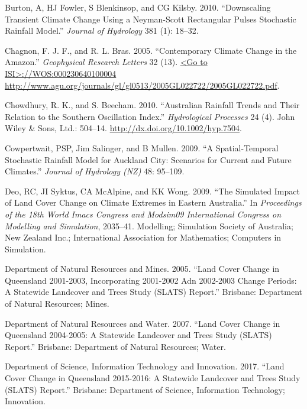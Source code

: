 \documentclass[]{elsarticle} %
\theoremstyle{definition}
\theoremstyle{definition}
\theoremstyle{definition}
\theoremstyle{remark}
\begin{document}
\hypertarget{ref-Burton2010}{}
Burton, A, HJ Fowler, S Blenkinsop, and CG Kilsby. 2010. ``Downscaling
Transient Climate Change Using a Neyman-Scott Rectangular Pulses
Stochastic Rainfall Model.'' \emph{Journal of Hydrology} 381 (1):
18--32.

\hypertarget{ref-Chagnon2005}{}
Chagnon, F. J. F., and R. L. Bras. 2005. ``Contemporary Climate Change
in the Amazon.'' \emph{Geophysical Research Letters} 32 (13).
\href{\%3CGo\%20to\%20ISI\%3E://WOS:000230640100004\%20http://www.agu.org/journals/gl/gl0513/2005GL022722/2005GL022722.pdf}{\textless{}Go to ISI\textgreater{}://WOS:000230640100004 http://www.agu.org/journals/gl/gl0513/2005GL022722/2005GL022722.pdf}.

\hypertarget{ref-Chowdhury2010}{}
Chowdhury, R. K., and S. Beecham. 2010. ``Australian Rainfall Trends and
Their Relation to the Southern Oscillation Index.'' \emph{Hydrological
Processes} 24 (4). John Wiley \& Sons, Ltd.: 504--14.
\url{http://dx.doi.org/10.1002/hyp.7504}.

\hypertarget{ref-Cowpertwait2009}{}
Cowpertwait, PSP, Jim Salinger, and B Mullen. 2009. ``A Spatial-Temporal
Stochastic Rainfall Model for Auckland City: Scenarios for Current and
Future Climates.'' \emph{Journal of Hydrology (NZ)} 48: 95--109.

\hypertarget{ref-Deo2009}{}
Deo, RC, JI Syktus, CA McAlpine, and KK Wong. 2009. ``The Simulated
Impact of Land Cover Change on Climate Extremes in Eastern Australia.''
In \emph{Proceedings of the 18th World Imacs Congress and Modsim09
International Congress on Modelling and Simulation}, 2035--41.
Modelling; Simulation Society of Australia; New Zealand Inc.;
International Association for Mathematics; Computers in Simulation.

\hypertarget{ref-SLATS2001}{}
Department of Natural Resources and Mines. 2005. ``Land Cover Change in
Queensland 2001-2003, Incorporating 2001-2002 Adn 2002-2003 Change
Periods: A Statewide Landcover and Trees Study (SLATS) Report.''
Brisbane: Department of Natural Resources; Mines.

\hypertarget{ref-SLATS2004}{}
Department of Natural Resources and Water. 2007. ``Land Cover Change in
Queensland 2004-2005: A Statewide Landcover and Trees Study (SLATS)
Report.'' Brisbane: Department of Natural Resources; Water.

\hypertarget{ref-SLATS2017}{}
Department of Science, Information Technology and Innovation. 2017.
``Land Cover Change in Queensland 2015-2016: A Statewide Landcover and
Trees Study (SLATS) Report.'' Brisbane: Department of Science,
Information Technology; Innovation.
\end{document}
